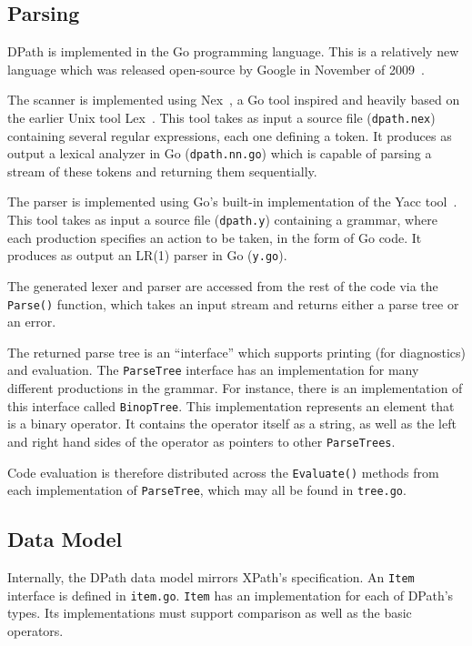 \documentclass{scrartcl}
\begin{document}
\subsection{Parsing}

DPath is implemented in the Go programming language. This is a relatively new
language which was released open-source by Google in November of
2009~\cite{golang}.

The scanner is implemented using Nex~\cite{nex}, a Go tool inspired and heavily
based on the earlier Unix tool Lex~\cite{lex}. This tool takes as input a source
file (\texttt{dpath.nex}) containing several regular expressions, each one
defining a token. It produces as output a lexical analyzer in Go
(\texttt{dpath.nn.go}) which is capable of parsing a stream of these tokens and
returning them sequentially.

The parser is implemented using Go's built-in implementation of the Yacc
tool~\cite{yacc}. This tool takes as input a source file (\texttt{dpath.y})
containing a grammar, where each production specifies an action to be taken, in
the form of Go code. It produces as output an LR(1) parser in Go
(\texttt{y.go}).

The generated lexer and parser are accessed from the rest of the code via the
\texttt{Parse()} function, which takes an input stream and returns either a
parse tree or an error.

The returned parse tree is an ``interface'' which supports printing (for
diagnostics) and evaluation. The \texttt{ParseTree} interface has an
implementation for many different productions in the grammar. For instance,
there is an implementation of this interface called \texttt{BinopTree}. This
implementation represents an element that is a binary operator. It contains the
operator itself as a string, as well as the left and right hand sides of the
operator as pointers to other \texttt{ParseTrees}.

Code evaluation is therefore distributed across the \texttt{Evaluate()} methods
from each implementation of \texttt{ParseTree}, which may all be found in
\texttt{tree.go}.

\subsection{Data Model}

Internally, the DPath data model mirrors XPath's specification. An \texttt{Item}
interface is defined in \texttt{item.go}. \texttt{Item} has an implementation
for each of DPath's types. Its implementations must support comparison as well
as the basic operators.
\end{document}
